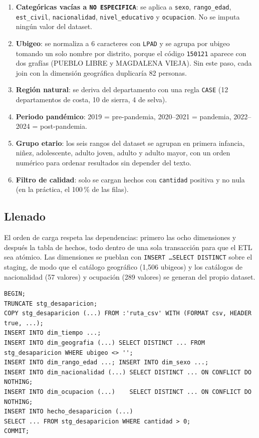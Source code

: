 \begin{enumerate}
  \item \textbf{Categ\'oricas vac\'ias a \texttt{NO ESPECIFICA}}: se aplica a \texttt{sexo},
        \texttt{rango\_edad}, \texttt{est\_civil}, \texttt{nacionalidad},
        \texttt{nivel\_educativo} y \texttt{ocupacion}. No se imputa ning\'un valor del dataset.
  \item \textbf{Ubigeo}: se normaliza a 6 caracteres con \texttt{LPAD} y se agrupa por ubigeo
        tomando un solo nombre por distrito, porque el c\'odigo \texttt{150121} aparece con dos
        graf\'ias (PUEBLO LIBRE y MAGDALENA VIEJA). Sin este paso, cada join con la dimensi\'on
        geogr\'afica duplicar\'ia 82 personas.
  \item \textbf{Regi\'on natural}: se deriva del departamento con una regla \texttt{CASE}
        (12 departamentos de costa, 10 de sierra, 4 de selva).
  \item \textbf{Periodo pand\'emico}: 2019 = pre-pandemia, 2020--2021 = pandemia,
        2022--2024 = post-pandemia.
  \item \textbf{Grupo etario}: los seis rangos del dataset se agrupan en primera infancia, ni\~nez,
        adolescente, adulto joven, adulto y adulto mayor, con un orden num\'erico para ordenar
        resultados sin depender del texto.
  \item \textbf{Filtro de calidad}: solo se cargan hechos con \texttt{cantidad} positiva y no
        nula (en la pr\'actica, el 100\,\% de las filas).
\end{enumerate}

\subsection{Llenado}
El orden de carga respeta las dependencias: primero las ocho dimensiones y despu\'es la tabla de
hechos, todo dentro de una sola transacci\'on para que el ETL sea at\'omico. Las dimensiones se
pueblan con \texttt{INSERT \dots SELECT DISTINCT} sobre el staging, de modo que el cat\'alogo
geogr\'afico (1,506 ubigeos) y los cat\'alogos de nacionalidad (57 valores) y ocupaci\'on (289
valores) se generan del propio dataset.

\begin{lstlisting}[style=sql]
BEGIN;
TRUNCATE stg_desaparicion;
COPY stg_desaparicion (...) FROM :'ruta_csv' WITH (FORMAT csv, HEADER true, ...);
INSERT INTO dim_tiempo ...;
INSERT INTO dim_geografia (...) SELECT DISTINCT ... FROM stg_desaparicion WHERE ubigeo <> '';
INSERT INTO dim_rango_edad ...; INSERT INTO dim_sexo ...;
INSERT INTO dim_nacionalidad (...) SELECT DISTINCT ... ON CONFLICT DO NOTHING;
INSERT INTO dim_ocupacion (...)    SELECT DISTINCT ... ON CONFLICT DO NOTHING;
INSERT INTO hecho_desaparicion (...)
SELECT ... FROM stg_desaparicion WHERE cantidad > 0;
COMMIT;
\end{lstlisting}

